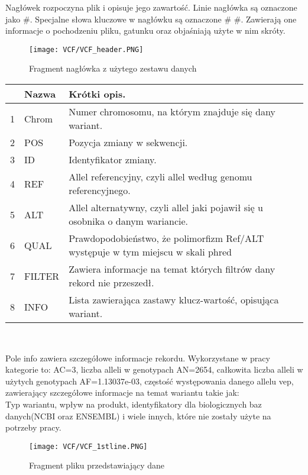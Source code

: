 \documentclass[12pt]{article}
\begin{document}
Nagłówek rozpoczyna plik i opisuje jego zawartość. Linie nagłówka są oznaczone jako {\#}. Specjalne słowa kluczowe w nagłówku są oznaczone {\# \#}. Zawierają one informacje o pochodzeniu pliku, gatunku oraz objaśniają użyte w nim skróty.
\begin{figure}[!htbp] 
  \centering
    \texttt{[image: VCF/VCF\_header.PNG]}
    \caption{Fragment nagłówka z użytego zestawu danych}
\end{figure}

\begin{center}
\begin{tabular}{|l|l|l|}
 \hline
 &Nazwa&Krótki opis.\\  \hline
1&Chrom&Numer chromosomu, na którym znajduje się dany wariant. \\ \hline
2&POS&Pozycja zmiany w sekwencji. \\  \hline
3&ID&Identyfikator zmiany.  \\  \hline
4&REF&Allel referencyjny, czyli allel według genomu referencyjnego.  \\  \hline
5&ALT&Allel alternatywny, czyli allel jaki pojawił się u osobnika o danym wariancie.  \\  \hline
6&QUAL&Prawdopodobieństwo, że polimorfizm Ref/ALT występuje w tym miejscu w skali phred   \\  \hline
7&FILTER&Zawiera informacje na temat których filtrów dany rekord nie przeszedł. \\  \hline
8&INFO&Lista zawierająca zastawy klucz-wartość, opisująca wariant. \\  \hline
\end{tabular}\\
\end{center} 

\vspace{1cm}

Pole info zawiera szczegółowe informacje rekordu.
Wykorzystane w pracy kategorie to:
AC=3, liczba alleli w genotypach
AN=2654, całkowita liczba alleli w użytych genotypach
AF=1.13037e-03, częstość występowania danego allelu
vep, zawierający szczegółowe informacje na temat wariantu takie jak: \\
Typ wariantu, wpływ na produkt, identyfikatory dla biologicznych baz danych(NCBI oraz ENSEMBL) i wiele innych, które nie zostały użyte na potrzeby pracy.

\begin{figure}[H]
  \centering
    \texttt{[image: VCF/VCF\_1stline.PNG]}
    \caption{Fragment pliku przedstawiający dane}
\end{figure}
\end{document}
